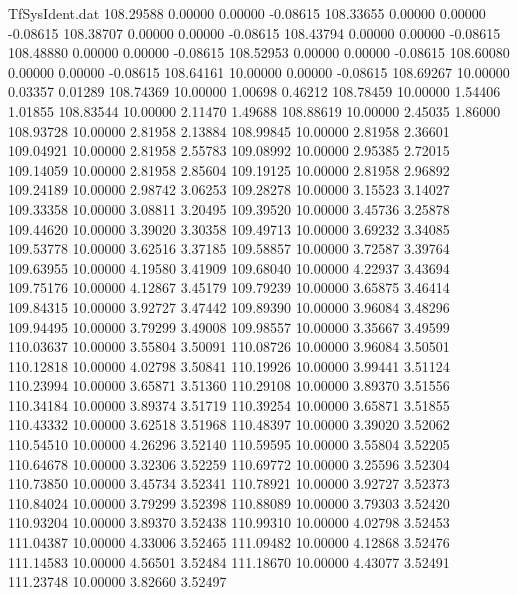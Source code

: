 \begin{filecontents}{TfSysIdent.dat}
 108.29588    0.00000    0.00000   -0.08615
 108.33655    0.00000    0.00000   -0.08615
 108.38707    0.00000    0.00000   -0.08615
 108.43794    0.00000    0.00000   -0.08615
 108.48880    0.00000    0.00000   -0.08615
 108.52953    0.00000    0.00000   -0.08615
 108.60080    0.00000    0.00000   -0.08615
 108.64161   10.00000    0.00000   -0.08615
 108.69267   10.00000    0.03357    0.01289
 108.74369   10.00000    1.00698    0.46212
 108.78459   10.00000    1.54406    1.01855
 108.83544   10.00000    2.11470    1.49688
 108.88619   10.00000    2.45035    1.86000
 108.93728   10.00000    2.81958    2.13884
 108.99845   10.00000    2.81958    2.36601
 109.04921   10.00000    2.81958    2.55783
 109.08992   10.00000    2.95385    2.72015
 109.14059   10.00000    2.81958    2.85604
 109.19125   10.00000    2.81958    2.96892
 109.24189   10.00000    2.98742    3.06253
 109.28278   10.00000    3.15523    3.14027
 109.33358   10.00000    3.08811    3.20495
 109.39520   10.00000    3.45736    3.25878
 109.44620   10.00000    3.39020    3.30358
 109.49713   10.00000    3.69232    3.34085
 109.53778   10.00000    3.62516    3.37185
 109.58857   10.00000    3.72587    3.39764
 109.63955   10.00000    4.19580    3.41909
 109.68040   10.00000    4.22937    3.43694
 109.75176   10.00000    4.12867    3.45179
 109.79239   10.00000    3.65875    3.46414
 109.84315   10.00000    3.92727    3.47442
 109.89390   10.00000    3.96084    3.48296
 109.94495   10.00000    3.79299    3.49008
 109.98557   10.00000    3.35667    3.49599
 110.03637   10.00000    3.55804    3.50091
 110.08726   10.00000    3.96084    3.50501
 110.12818   10.00000    4.02798    3.50841
 110.19926   10.00000    3.99441    3.51124
 110.23994   10.00000    3.65871    3.51360
 110.29108   10.00000    3.89370    3.51556
 110.34184   10.00000    3.89374    3.51719
 110.39254   10.00000    3.65871    3.51855
 110.43332   10.00000    3.62518    3.51968
 110.48397   10.00000    3.39020    3.52062
 110.54510   10.00000    4.26296    3.52140
 110.59595   10.00000    3.55804    3.52205
 110.64678   10.00000    3.32306    3.52259
 110.69772   10.00000    3.25596    3.52304
 110.73850   10.00000    3.45734    3.52341
 110.78921   10.00000    3.92727    3.52373
 110.84024   10.00000    3.79299    3.52398
 110.88089   10.00000    3.79303    3.52420
 110.93204   10.00000    3.89370    3.52438
 110.99310   10.00000    4.02798    3.52453
 111.04387   10.00000    4.33006    3.52465
 111.09482   10.00000    4.12868    3.52476
 111.14583   10.00000    4.56501    3.52484
 111.18670   10.00000    4.43077    3.52491
 111.23748   10.00000    3.82660    3.52497

\end{filecontents}
